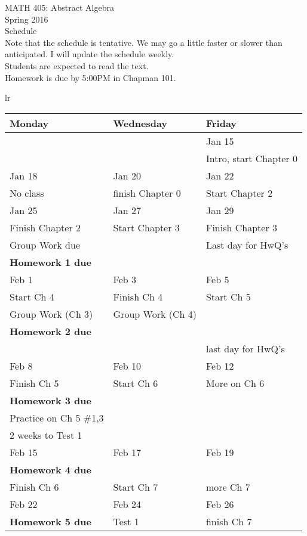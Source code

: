 \documentclass[11pt]{article}
\begin{document}
MATH 405:  Abstract Algebra \\ Spring 2016 \\ Schedule\\

Note that the schedule is tentative. We may go a little faster or slower than anticipated. I will update the schedule weekly.\\

Students are expected to read the text. \\

Homework is due by 5:00PM in Chapman 101.\\

\hrulefill


\begin{tabular}{lr}
\begin{tabular}{|l|l|l|}
\hline
Monday & Wednesday & Friday \\
\hline \hline
&&Jan 15\\
&&Intro, start Chapter 0\\
\hline
Jan 18 & Jan 20 & Jan 22 \\
No class &finish Chapter 0  & Start Chapter 2\\
\hline
Jan 25& Jan 27 & Jan 29 \\
Finish Chapter 2 &Start Chapter 3&Finish Chapter 3\\
Group Work due &&Last day for HwQ's\\
\textbf{Homework 1 due}&&\\
\hline
Feb 1 & Feb 3 & Feb 5 \\
Start Ch 4 & Finish Ch 4& Start Ch 5\\
Group Work (Ch 3)& Group Work (Ch 4) &\\
\textbf{Homework 2 due}&&\\
&& last day for HwQ's\\
\hline
Feb 8&Feb 10&Feb 12\\
Finish Ch 5 & Start Ch 6 & More on Ch 6\\
\textbf{Homework 3 due}&&\\
Practice on Ch 5 \#1,3&&\\
2 weeks to Test 1&&\\
\hline
Feb 15& Feb 17 & Feb 19 \\
\textbf{Homework 4 due}&&\\
Finish Ch 6 & Start Ch 7& more Ch 7 \\
\hline
Feb  22 & Feb 24 & Feb 26 \\
\textbf{Homework 5 due} & Test 1 &  finish Ch 7\\

\end{tabular}
\end{tabular}
\end{document}
